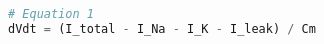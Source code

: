 \begin{lstlisting}[language=Python, caption={Python implementation of the Hodgkin-Huxley neuron's first equation}, label={lst:hodgkin-huxleymodelLst1}]
# Equation 1
dVdt = (I_total - I_Na - I_K - I_leak) / Cm
\end{lstlisting}